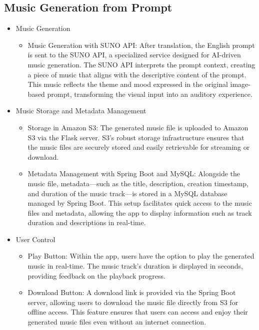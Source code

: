 \documentclass[conference]{IEEEtran}
\begin{document}
\subsection{Music Generation from Prompt }
\begin{itemize}
    \item Music Generation
\begin{itemize}
    \item Music Generation with SUNO API: After translation, the English prompt is sent to the SUNO API, a specialized service designed for AI-driven music generation. The SUNO API interprets the prompt context, creating a piece of music that aligns with the descriptive content of the prompt. This music reflects the theme and mood expressed in the original image-based prompt, transforming the visual input into an auditory experience.\\
\end{itemize}
\end{itemize}
\begin{itemize}
    \item Music Storage and Metadata Management
\begin{itemize}
    \item Storage in Amazon S3: The generated music file is uploaded to Amazon S3 via the Flask server. S3’s robust storage infrastructure ensures that the music files are securely stored and easily retrievable for streaming or download.\\
    \item Metadata Management with Spring Boot and MySQL: Alongside the music file, metadata—such as the title, description, creation timestamp, and duration of the music track—is stored in a MySQL database managed by Spring Boot. This setup facilitates quick access to the music files and metadata, allowing the app to display information such as track duration and descriptions in real-time.\\
\end{itemize}
\item User Control
\begin{itemize}
    \item Play Button: Within the app, users have the option to play the generated music in real-time. The music track’s duration is displayed in seconds, providing feedback on the playback progress.\\
    \item Download Button: A download link is provided via the Spring Boot server, allowing users to download the music file directly from S3 for offline access. This feature ensures that users can access and enjoy their generated music files even without an internet connection.\\
\end{itemize}
\end{itemize}
\end{document}
